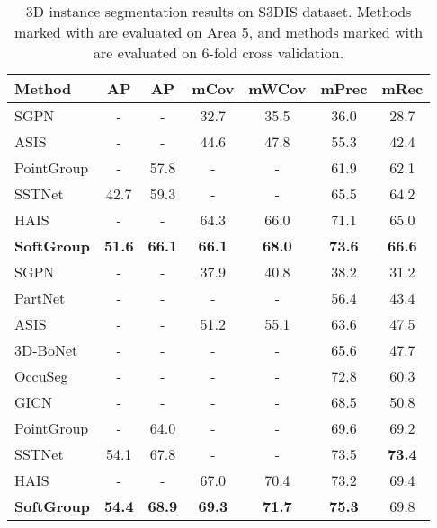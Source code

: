 \documentclass[10pt,twocolumn,letterpaper]{article}
\begin{document}
	\begin{table}[]
		\small
		\setlength{\tabcolsep}{2.8pt}
		\begin{tabular}{@{}lcccccc@{}} \toprule
			Method     & AP   & AP & mCov & mWCov & mPrec & mRec \\ \midrule
			SGPN \cite{wang2018sgpn}       &   -   &  -    & 32.7 & 35.5  & 36.0    & 28.7   \\
			ASIS \cite{wang2019associatively}       &  -    &  -    & 44.6 & 47.8  & 55.3    & 42.4   \\
			PointGroup \cite{jiang2020pointgroup} &  -    & 57.8 &   -   &   -    & 61.9    & 62.1   \\
			SSTNet \cite{liang2021instance}     & 42.7 & 59.3 &   -   &  -     & 65.5    & 64.2   \\
			HAIS \cite{chen2021hierarchical}       &   -   &   -   & 64.3 & 66.0  & 71.1    & 65.0   \\
			\textbf{SoftGroup}  & \textbf{51.6} & \textbf{66.1} & \textbf{66.1} & \textbf{68.0}  & \textbf{73.6}    & \textbf{66.6}   \\ \midrule
			SGPN \cite{wang2018sgpn}       &  -    &    -  & 37.9 & 40.8  & 38.2    & 31.2   \\
			PartNet \cite{mo2019partnet}    &   -   &    -  &   -   &     -  & 56.4    & 43.4   \\
			ASIS \cite{wang2019associatively}       &   -   &   -   & 51.2 & 55.1  & 63.6    & 47.5   \\
			3D-BoNet \cite{yang2019learning}   &  -    &   -   &   -   &     -  & 65.6    & 47.7   \\
			OccuSeg \cite{han2020occuseg}    &   -   &  -    &    -  &    -   & 72.8    & 60.3   \\
			GICN \cite{liu2020learning}       &   -   &   -   &    -  &    -   & 68.5    & 50.8   \\
			PointGroup \cite{jiang2020pointgroup} &   -   & 64.0 & -     &  -     & 69.6    & 69.2   \\
			SSTNet  \cite{liang2021instance}     & 54.1 & 67.8 & -     &   -    & 73.5    & \textbf{73.4}   \\
			HAIS  \cite{chen2021hierarchical}      &   -   &    -  & 67.0 & 70.4  & 73.2    & 69.4   \\
			\textbf{SoftGroup}  & \textbf{54.4} & \textbf{68.9} & \textbf{69.3} & \textbf{71.7}  & \textbf{75.3}    & 69.8  \\ \bottomrule
		\end{tabular}
		\caption{3D instance segmentation results on S3DIS dataset. Methods marked with  are evaluated on Area 5, and methods marked with   are evaluated on 6-fold cross validation.}
		\label{tab:s3dis_benchmark}
	\end{table}
	
\end{document}
